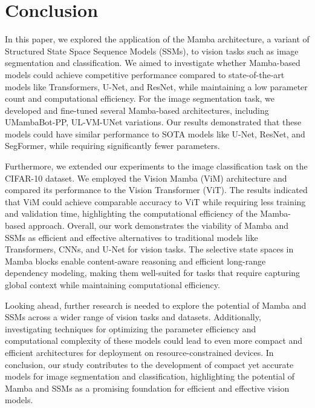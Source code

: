 \documentclass[conference]{IEEEtran}
\begin{document}
\section{Conclusion}
In this paper, we explored the application of the Mamba architecture, a variant of Structured State Space Sequence Models (SSMs), to vision tasks such as image segmentation and classification. We aimed to investigate whether Mamba-based models could achieve competitive performance compared to state-of-the-art models like Transformers, U-Net, and ResNet, while maintaining a low parameter count and computational efficiency.
For the image segmentation task, we developed and fine-tuned several Mamba-based architectures, including UMambaBot-PP, UL-VM-UNet variations. Our results demonstrated that these models could have similar performance to SOTA models like U-Net, ResNet, and SegFormer, while requiring significantly fewer parameters. 

Furthermore, we extended our experiments to the image classification task on the CIFAR-10 dataset. We employed the Vision Mamba (ViM) architecture and compared its performance to the Vision Transformer (ViT). The results indicated that ViM could achieve comparable accuracy to ViT while requiring less training and validation time, highlighting the computational efficiency of the Mamba-based approach.
Overall, our work demonstrates the viability of Mamba and SSMs as efficient and effective alternatives to traditional models like Transformers, CNNs, and U-Net for vision tasks. The selective state spaces in Mamba blocks enable content-aware reasoning and efficient long-range dependency modeling, making them well-suited for tasks that require capturing global context while maintaining computational efficiency.

Looking ahead, further research is needed to explore the potential of Mamba and SSMs across a wider range of vision tasks and datasets. Additionally, investigating techniques for optimizing the parameter efficiency and computational complexity of these models could lead to even more compact and efficient architectures for deployment on resource-constrained devices.
In conclusion, our study contributes to the development of compact yet accurate models for image segmentation and classification, highlighting the potential of Mamba and SSMs as a promising foundation for efficient and effective vision models.
\end{document}

